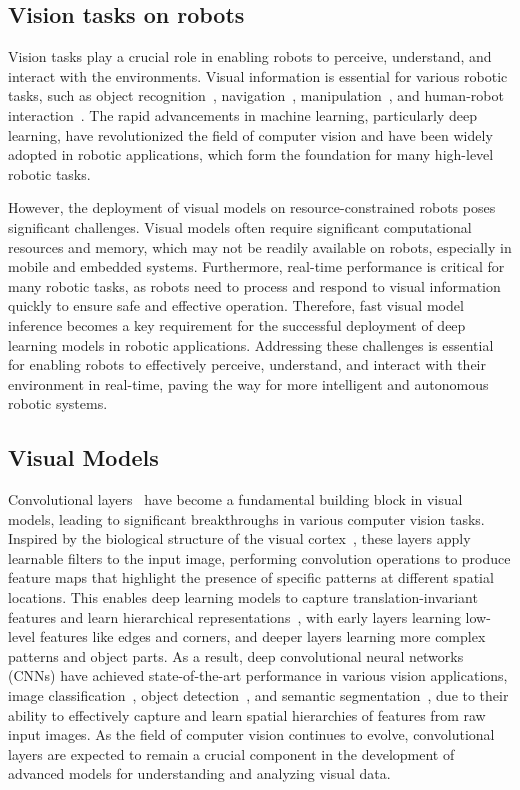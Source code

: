 \subsection{Vision tasks on robots}
Vision tasks play a crucial role in enabling robots to perceive, understand, and interact with the environments. 
Visual information is essential for various robotic tasks, such as object recognition~\cite{galvez2018object}, navigation~\cite{ran2017convolutional}, manipulation~\cite{bayar2018constrained}, and human-robot interaction~\cite{wu2019weight}. 
The rapid advancements in machine learning, particularly deep learning, have revolutionized the field of computer vision and have been widely adopted in robotic applications, which form the foundation for many high-level robotic tasks.

However, the deployment of visual models on resource-constrained robots poses significant challenges. 
Visual models often require significant computational resources and memory, which may not be readily available on robots, especially in mobile and embedded systems. 
Furthermore, real-time performance is critical for many robotic tasks, as robots need to process and respond to visual information quickly to ensure safe and effective operation. 
Therefore, fast visual model inference becomes a key requirement for the successful deployment of deep learning models in robotic applications.
Addressing these challenges is essential for enabling robots to effectively perceive, understand, and interact with their environment in real-time, paving the way for more intelligent and autonomous robotic systems.


\subsection{Visual Models}
Convolutional layers~\cite{o2015introduction} have become a fundamental building block in visual models, leading to significant breakthroughs in various computer vision tasks. 
Inspired by the biological structure of the visual cortex~\cite{tripp2019approximating}, these layers apply learnable filters to the input image, performing convolution operations to produce feature maps that highlight the presence of specific patterns at different spatial locations. 
This enables deep learning models to capture translation-invariant features and learn hierarchical representations~\cite{ma2015hierarchical}, with early layers learning low-level features like edges and corners, and deeper layers learning more complex patterns and object parts. 
As a result, deep convolutional neural networks (CNNs) have achieved state-of-the-art performance in various vision applications, image classification~\cite{rawat2017deep}, object detection~\cite{galvez2018object}, and semantic segmentation~\cite{wang2018understanding}, due to their ability to effectively capture and learn spatial hierarchies of features from raw input images. 
As the field of computer vision continues to evolve, convolutional layers are expected to remain a crucial component in the development of advanced models for understanding and analyzing visual data.

